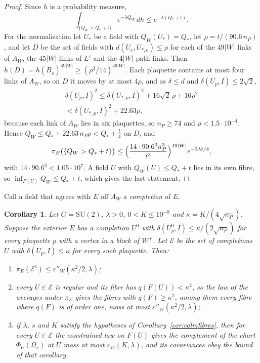 \documentclass[11pt]{amsart}
\newtheorem{corollary}[theorem]{Corollary}
\theoremstyle{definition}
\theoremstyle{remark}
\numberwithin{equation}{section}
\newcommand{\SU}{\mathrm{SU}}
\begin{document}
\begin{proof}
Since $h$ is a probability measure,
\[
\int_{\{Q_W>Q_*+t\}}e^{-\lambda Q_W}\,dh\le e^{-\lambda(Q_*+t)}.
\]
For the normalisation let $U_*$ be a field with
$Q_W(U_*)=Q_*$, let $\rho=t/(90.6\,n_P)$, and let $D$ be the set of fields
with $d(U_e,U_{*,e})\le\rho$ for each of the $49|W|$ links of $A_W$, the
$45|W|$ links of $L'$ and the $4|W|$ path links. Then $h(D)=h(B_\rho)
^{49|W|}\ge(\rho^3/14)^{49|W|}$. Each plaquette contains at most four links
of $A_W$, so on $D$ it moves by at most $4\rho$, and as $\delta\le d$ and
$\delta(U_p,I)\le2\sqrt2$,
\begin{multline*}
\delta(U_p,I)^2\le\delta(U_{*,p},I)^2+16\sqrt2\,\rho+16\rho^2\\
<\delta(U_{*,p},I)^2+22.63\rho,
\end{multline*}
because each link of $A_W$ lies in six plaquettes, so $n_P\ge74$ and $\rho<
1.5\cdot10^{-4}$. Hence $Q_W\le Q_*+22.63\,n_P\rho<Q_*+\frac t4$ on $D$, and
\[
\pi_E\bigl(\{Q_W>Q_*+t\}\bigr)\le\Bigl(\frac{14\cdot90.6^3n_P^3}{t^3}\Bigr)
^{49|W|}e^{-3\lambda t/4},
\]
with $14\cdot90.6^3<1.05\cdot10^7$. A field $U$ with $Q_W(U)\le Q_*+t$ lies
in its own fibre, so $\inf_{F(U)}Q_W\le Q_*+t$, which gives the last
statement.
\end{proof}

Call a field that agrees with $E$ off $A_W$ a \emph{completion} of $E$.

\begin{corollary}\label{cor:calmexterior}
Let $G=\SU(2)$, $\lambda>0$, $0<K\le10^{-8}$ and $\kappa=K/(4\sqrt{n_P})$.
Suppose the exterior $E$ has a completion $U^0$ with $\delta(U^0_p,I)\le
\kappa/(2\sqrt{n_P})$ for every plaquette $p$ with a vertex in a block of
$W^+$. Let $\mathcal E$ be the set of completions $U$ with $\delta(U_p,I)\le
\kappa$ for every such plaquette. Then:
\begin{enumerate}[label=\textup{(\roman*)},leftmargin=*]
\item $\pi_E(\mathcal E^c)\le\varepsilon''_W(\kappa^2/2,\lambda)$;
\item every $U\in\mathcal E$ is regular and its fibre has $q(F(U))<
\kappa^2$, so the law of the averages under $\pi_E$ gives the fibres with
$q(F)\ge\kappa^2$, among them every fibre where $q(F)$ is of order one, mass
at most $\varepsilon''_W(\kappa^2/2,\lambda)$;
\item if $\lambda$, $s$ and $K$ satisfy the hypotheses of
Corollary~\ref{cor:calmfibres}, then for every $U\in\mathcal E$ the
constrained law on $F(U)$ gives the complement of the chart $\Phi_U(
\Omega_r)$ at $U$ mass at most $\varepsilon_W(K,\lambda)$, and its
covariances obey the bound of that corollary.
\end{enumerate}
\end{corollary}
\end{document}
